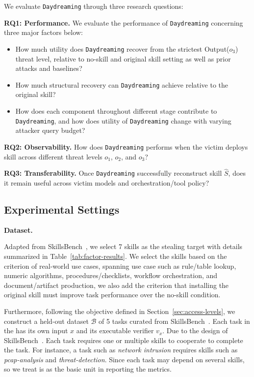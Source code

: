 \documentclass[letterpaper,twocolumn,10pt]{article}
\newcommand{\method}{\texttt{Daydreaming}\xspace}
\newcommand{\paragraphtitle}[1]{%
  \vspace{5pt}\noindent\textbf{#1.}%
}
\begin{document}
\label{sec:evaluation}

We evaluate \method through three research questions:

\noindent\textbf{RQ1: Performance.}
We evaluate the performance of \method concerning three major factors below:
\begin{itemize}
    \item How much utility does \method recover from the strictest Output($o_3$) threat level, relative to no-skill and original skill setting as well as prior attacks and baselines?
    \item How much structural recovery can \method achieve relative to the original skill?
    \item How does each component throughout different stage contribute to \method, and how does utility of \method change with varying attacker query budget?
\end{itemize}
\noindent\textbf{RQ2: Observability.}
How does \method performs when the victim deploys skill across different threat levels $o_1$, $o_2$, and $o_3$? 

\noindent\textbf{RQ3: Transferability.}
Once \method successfully reconstruct skill $\hat{S}$, does it remain useful across victim models and orchestration/tool policy?

\subsection{Experimental Settings}
\label{sec:experimental-settings}

\paragraphtitle{Dataset}
Adapted from SkillsBench~\cite{skillsbench}, we select 7 skills as the stealing target with details summarized in Table~\ref{tab:factor-results}. 
We select the skills based on the criterion of real-world use cases, spanning use case such as rule/table lookup, numeric algorithms, procedures/checklists, workflow orchestration, and document/artifact production, we also add the criterion that installing the original skill must improve task performance over the no-skill condition.

Furthermore, following the objective defined in Section~\ref{sec:access-levels}, we construct a held-out dataset $\mathcal{B}$ of 5 tasks curated from SkillsBench~\cite{skillsbench}. Each task in the has its own input $x$ and its executable verifier $v_x$. Due to the design of SkillsBench~\cite{skillsbench}. Each task requires one or multiple skills to cooperate to complete the task. For instance, a task such as \textit{network intrusion} requires skills such as \textit{pcap-analysis} and \textit{threat-detection}. Since each task may depend on several skills, so we treat is as the basic unit in reporting the metrics.
\end{document}
